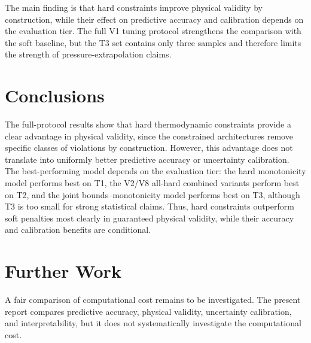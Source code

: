 \documentclass[11pt]{article}
\begin{document}
The main finding is that hard constraints improve physical validity by
construction, while their effect on predictive accuracy and calibration depends
on the evaluation tier. The full V1 tuning protocol strengthens the comparison
with the soft baseline, but the T3 set contains only three samples and therefore
limits the strength of pressure-extrapolation claims.

\section{Conclusions}

The full-protocol results show that hard thermodynamic constraints provide a clear
advantage in physical validity, since the constrained architectures remove
specific classes of violations by construction. However, this advantage does
not translate into uniformly better predictive accuracy or uncertainty
calibration. The best-performing model depends on the evaluation tier: the hard
monotonicity model performs best on T1, the V2/V8 all-hard combined variants perform best on T2,
and the joint bounds--monotonicity model performs best on T3, although T3 is
too small for strong statistical claims. Thus, hard constraints outperform soft
penalties most clearly in guaranteed physical validity, while their accuracy
and calibration benefits are conditional.

\section{Further Work}

A fair comparison of computational cost remains to be investigated. The present
report compares predictive accuracy, physical validity, uncertainty
calibration, and interpretability, but it does not systematically investigate the computational cost.
\end{document}
